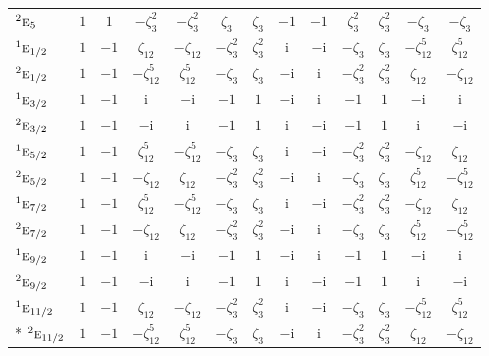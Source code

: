 \documentclass[10pt,a4paper]{article}
\makeatletter
\def\grouprule#1#2{\noalign{\marks\LTgroupmarks{\the\belowrulesep}\nobreak\vskip#1%
  \vskip\aboverulesep}\multispan\LT@cols\unskip{\leaders\hrule\@height#2\hfill\kern\z@}\cr
  \noalign{\penalty\LTrulebreak\vskip\belowrulesep\global\@lastruleclass\z@}}
\numberwithin{equation}{section}
\newcommand{\irr}[1]{\text{\normalfont\scshape #1}}
\newcommand{\conjpair}[1]{{}^{#1}}
\newcommand{\iunit}{\mathrm{i}}
\newcommand{\rootunity}[1]{\zeta_{#1}}
\makeatother
\begin{document}
{\begin{longtable}{@{}lcccccccccccc@{}}
$\conjpair{2}\irr{e}_{5}$ & $1$ & $1$ & $-\rootunity{3}^{2}$ & $-\rootunity{3}^{2}$ & $\rootunity{3}$ & $\rootunity{3}$ & $-1$ & $-1$ & $\rootunity{3}^{2}$ & $\rootunity{3}^{2}$ & $-\rootunity{3}$ & $-\rootunity{3}$\\
\grouprule{0pt}{\lightrulewidth}
$\conjpair{1}\irr{e}_{1/2}$ & $1$ & $-1$ & $\rootunity{12}$ & $-\rootunity{12}$ & $-\rootunity{3}^{2}$ & $\rootunity{3}^{2}$ & $\iunit{}$ & $-\iunit{}$ & $-\rootunity{3}$ & $\rootunity{3}$ & $-\rootunity{12}^{5}$ & $\rootunity{12}^{5}$\\
$\conjpair{2}\irr{e}_{1/2}$ & $1$ & $-1$ & $-\rootunity{12}^{5}$ & $\rootunity{12}^{5}$ & $-\rootunity{3}$ & $\rootunity{3}$ & $-\iunit{}$ & $\iunit{}$ & $-\rootunity{3}^{2}$ & $\rootunity{3}^{2}$ & $\rootunity{12}$ & $-\rootunity{12}$\\
$\conjpair{1}\irr{e}_{3/2}$ & $1$ & $-1$ & $\iunit{}$ & $-\iunit{}$ & $-1$ & $1$ & $-\iunit{}$ & $\iunit{}$ & $-1$ & $1$ & $-\iunit{}$ & $\iunit{}$\\
$\conjpair{2}\irr{e}_{3/2}$ & $1$ & $-1$ & $-\iunit{}$ & $\iunit{}$ & $-1$ & $1$ & $\iunit{}$ & $-\iunit{}$ & $-1$ & $1$ & $\iunit{}$ & $-\iunit{}$\\
$\conjpair{1}\irr{e}_{5/2}$ & $1$ & $-1$ & $\rootunity{12}^{5}$ & $-\rootunity{12}^{5}$ & $-\rootunity{3}$ & $\rootunity{3}$ & $\iunit{}$ & $-\iunit{}$ & $-\rootunity{3}^{2}$ & $\rootunity{3}^{2}$ & $-\rootunity{12}$ & $\rootunity{12}$\\
$\conjpair{2}\irr{e}_{5/2}$ & $1$ & $-1$ & $-\rootunity{12}$ & $\rootunity{12}$ & $-\rootunity{3}^{2}$ & $\rootunity{3}^{2}$ & $-\iunit{}$ & $\iunit{}$ & $-\rootunity{3}$ & $\rootunity{3}$ & $\rootunity{12}^{5}$ & $-\rootunity{12}^{5}$\\
$\conjpair{1}\irr{e}_{7/2}$ & $1$ & $-1$ & $\rootunity{12}^{5}$ & $-\rootunity{12}^{5}$ & $-\rootunity{3}$ & $\rootunity{3}$ & $\iunit{}$ & $-\iunit{}$ & $-\rootunity{3}^{2}$ & $\rootunity{3}^{2}$ & $-\rootunity{12}$ & $\rootunity{12}$\\
$\conjpair{2}\irr{e}_{7/2}$ & $1$ & $-1$ & $-\rootunity{12}$ & $\rootunity{12}$ & $-\rootunity{3}^{2}$ & $\rootunity{3}^{2}$ & $-\iunit{}$ & $\iunit{}$ & $-\rootunity{3}$ & $\rootunity{3}$ & $\rootunity{12}^{5}$ & $-\rootunity{12}^{5}$\\
$\conjpair{1}\irr{e}_{9/2}$ & $1$ & $-1$ & $\iunit{}$ & $-\iunit{}$ & $-1$ & $1$ & $-\iunit{}$ & $\iunit{}$ & $-1$ & $1$ & $-\iunit{}$ & $\iunit{}$\\
$\conjpair{2}\irr{e}_{9/2}$ & $1$ & $-1$ & $-\iunit{}$ & $\iunit{}$ & $-1$ & $1$ & $\iunit{}$ & $-\iunit{}$ & $-1$ & $1$ & $\iunit{}$ & $-\iunit{}$\\
$\conjpair{1}\irr{e}_{11/2}$ & $1$ & $-1$ & $\rootunity{12}$ & $-\rootunity{12}$ & $-\rootunity{3}^{2}$ & $\rootunity{3}^{2}$ & $\iunit{}$ & $-\iunit{}$ & $-\rootunity{3}$ & $\rootunity{3}$ & $-\rootunity{12}^{5}$ & $\rootunity{12}^{5}$\\*
$\conjpair{2}\irr{e}_{11/2}$ & $1$ & $-1$ & $-\rootunity{12}^{5}$ & $\rootunity{12}^{5}$ & $-\rootunity{3}$ & $\rootunity{3}$ & $-\iunit{}$ & $\iunit{}$ & $-\rootunity{3}^{2}$ & $\rootunity{3}^{2}$ & $\rootunity{12}$ & $-\rootunity{12}$\\
\bottomrule\end{longtable}}
\end{document}
